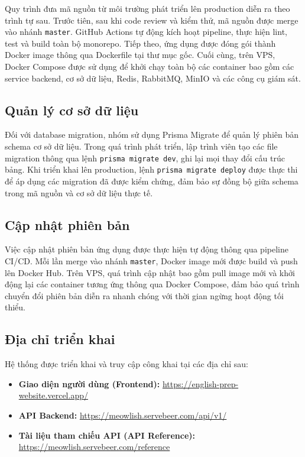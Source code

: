 Quy trình đưa mã nguồn từ môi trường phát triển lên production diễn ra theo trình tự sau. Trước tiên, sau khi code review và kiểm thử, mã nguồn được merge vào nhánh \texttt{master}. GitHub Actions tự động kích hoạt pipeline, thực hiện lint, test và build toàn bộ monorepo. Tiếp theo, ứng dụng được đóng gói thành Docker image thông qua Dockerfile tại thư mục gốc. Cuối cùng, trên VPS, Docker Compose được sử dụng để khởi chạy toàn bộ các container bao gồm các service backend, cơ sở dữ liệu, Redis, RabbitMQ, MinIO và các công cụ giám sát.

\subsection{Quản lý cơ sở dữ liệu}

Đối với database migration, nhóm sử dụng Prisma Migrate \cite{prisma_docs} để quản lý phiên bản schema cơ sở dữ liệu. Trong quá trình phát triển, lập trình viên tạo các file migration thông qua lệnh \texttt{prisma migrate dev}, ghi lại mọi thay đổi cấu trúc bảng. Khi triển khai lên production, lệnh \texttt{prisma migrate deploy} được thực thi để áp dụng các migration đã được kiểm chứng, đảm bảo sự đồng bộ giữa schema trong mã nguồn và cơ sở dữ liệu thực tế.

\subsection{Cập nhật phiên bản}

Việc cập nhật phiên bản ứng dụng được thực hiện tự động thông qua pipeline CI/CD. Mỗi lần merge vào nhánh \texttt{master}, Docker image mới được build và push lên Docker Hub. Trên VPS, quá trình cập nhật bao gồm pull image mới và khởi động lại các container tương ứng thông qua Docker Compose, đảm bảo quá trình chuyển đổi phiên bản diễn ra nhanh chóng với thời gian ngừng hoạt động tối thiểu.

\subsection{Địa chỉ triển khai}

Hệ thống được triển khai và truy cập công khai tại các địa chỉ sau:

\begin{itemize}
    \item \textbf{Giao diện người dùng (Frontend):} \url{https://english-prep-website.vercel.app/}
    \item \textbf{API Backend:} \url{https://meowlish.servebeer.com/api/v1/}
    \item \textbf{Tài liệu tham chiếu API (API Reference):} \url{https://meowlish.servebeer.com/reference}
\end{itemize}

